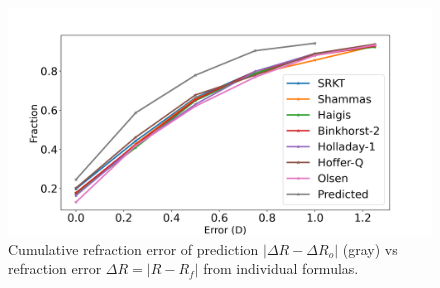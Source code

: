 \documentclass[article,twocolumn,preprint,10pt]{paper}%
\renewcommand{\(}{\left(}
\renewcommand{\)}{\right)}
\renewcommand{\[}{\left[}
\renewcommand{\]}{\right]}
\newcommand{\1}{\mbox{\boldmath$1$}}
\begin{document}
\begin{figure}
	\includegraphics[width=1\linewidth]{dRFormulasVsClassification.png}
	\caption{Cumulative refraction error of prediction $|\Delta R-\Delta R_o|$ (gray) vs refraction error $\Delta R=|R-R_f|$ from individual formulas.}
	\label{fig:cumulativeddRFormulaVsPredicted}
\end{figure} 




\end{document}
